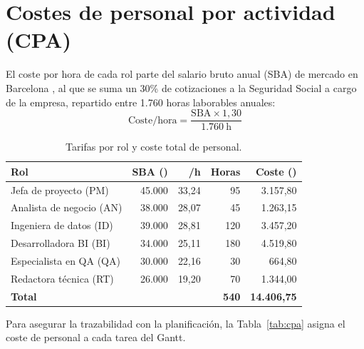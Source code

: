 \documentclass[12pt, a4paper, oneside]{report}
\begin{document}
\section{Costes de personal por actividad (CPA)}
El coste por hora de cada rol parte del salario bruto anual (SBA) de mercado en Barcelona \cite{glassdoor_barcelona}, al que se suma un 30\% de cotizaciones a la Seguridad Social a cargo de la empresa, repartido entre 1.760 horas laborables anuales:
\begin{equation}
\text{Coste/hora} = \frac{\text{SBA} \times 1{,}30}{1.760\ \text{h}}
\end{equation}

\begin{table}[H]
\centering
\small
\renewcommand{\arraystretch}{1.05}
\begin{tabularx}{\textwidth}{@{} X r r r r @{}}
\toprule
\textbf{Rol} & \textbf{SBA (\texteuro{})} & \textbf{\texteuro{}/h} & \textbf{Horas} & \textbf{Coste (\texteuro{})} \\ \midrule
Jefa de proyecto (PM) & 45.000 & 33,24 & 95 & 3.157,80 \\
Analista de negocio (AN) & 38.000 & 28,07 & 45 & 1.263,15 \\
Ingeniera de datos (ID) & 39.000 & 28,81 & 120 & 3.457,20 \\
Desarrolladora BI (BI) & 34.000 & 25,11 & 180 & 4.519,80 \\
Especialista en QA (QA) & 30.000 & 22,16 & 30 & 664,80 \\
Redactora técnica (RT) & 26.000 & 19,20 & 70 & 1.344,00 \\ \midrule
\textbf{Total} & & & \textbf{540} & \textbf{14.406,75} \\ \bottomrule
\end{tabularx}
\caption{Tarifas por rol y coste total de personal.}
\label{tab:tarifas}
\end{table}

Para asegurar la trazabilidad con la planificación, la Tabla~\ref{tab:cpa} asigna el coste de personal a cada tarea del Gantt.
\end{document}
